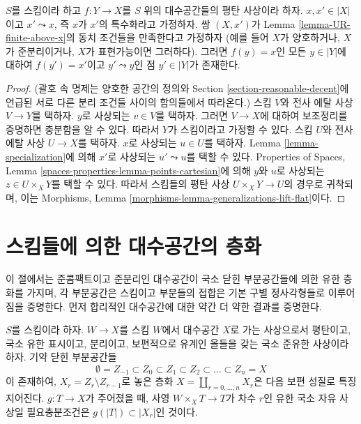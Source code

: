 \begin{lemma}
\label{lemma-generalizations-lift-flat}
$S$를 스킴이라 하고 $f : Y \to X$를 $S$ 위의 대수공간들의 평탄
사상이라 하자. $x, x' \in |X|$이고 $x' \leadsto x$, 즉 $x$가
$x'$의 특수화라고 가정하자. 쌍 $(X, x')$가 Lemma
\ref{lemma-UR-finite-above-x}의 동치 조건들을 만족한다고 가정하자
(예를 들어 $X$가 양호하거나, $X$가 준분리이거나, $X$가
표현가능이면 그러하다). 그러면 $f(y) = x$인 모든
$y \in |Y|$에 대하여 $f(y') = x'$이고 $y' \leadsto y$인 점
$y' \in |Y|$가 존재한다.
\end{lemma}

\begin{proof}
(괄호 속 명제는 양호한 공간의 정의와 Section
\ref{section-reasonable-decent}에 언급된 서로 다른 분리 조건들 사이의
함의들에서 따라온다.)
스킴 $V$와 전사 에탈 사상 $V \to Y$를 택하자. $y$로 사상되는
$v \in V$를 택하자. 그러면 $V \to X$에 대하여 보조정리를 증명하면
충분함을 알 수 있다. 따라서 $Y$가 스킴이라고 가정할 수 있다.
스킴 $U$와 전사 에탈 사상 $U \to X$를 택하자. $x$로 사상되는
$u \in U$를 택하자. Lemma \ref{lemma-specialization}에 의해
$x'$로 사상되는 $u' \leadsto u$를 택할 수 있다.
Properties of Spaces, Lemma
\ref{spaces-properties-lemma-points-cartesian}에 의해 $y$와 $u$로
사상되는 $z \in U \times_X Y$를 택할 수 있다.
따라서 스킴들의 평탄 사상 $U \times_X Y \to U$의 경우로
귀착되며, 이는 Morphisms, Lemma
\ref{morphisms-lemma-generalizations-lift-flat}이다.
\end{proof}


\section{스킴들에 의한 대수공간의 층화}
\label{section-stratifications}

\noindent
이 절에서는 준콤팩트이고 준분리인 대수공간이 국소 닫힌 부분공간들에
의한 유한 층화를 가지며, 각 부분공간은 스킴이고 부분들의 접합은
기본 구별 정사각형들로 이루어짐을 증명한다. 먼저 합리적인
대수공간에 대한 약간 더 약한 결과를 증명한다.

\begin{lemma}
\label{lemma-quasi-compact-reasonable-stratification}
$S$를 스킴이라 하자. $W \to X$를 스킴 $W$에서 대수공간 $X$로
가는 사상으로서 평탄이고, 국소 유한 표시이고, 분리이고,
보편적으로 유계인 올들을 갖는 국소 준유한 사상이라 하자.
기약 닫힌 부분공간들
$$
\emptyset = Z_{-1} \subset Z_0 \subset Z_1 \subset Z_2 \subset
\ldots \subset Z_n = X
$$
이 존재하여, $X_r = Z_r \setminus Z_{r - 1}$로 놓은 층화
$X = \coprod_{r = 0, \ldots, n} X_r$은 다음 보편 성질로 특징지어진다.
$g : T \to X$가 주어졌을 때, 사영 $W \times_X T \to T$가 차수
$r$인 유한 국소 자유 사상일 필요충분조건은
$g(|T|) \subset |X_r|$인 것이다.
\end{lemma}

